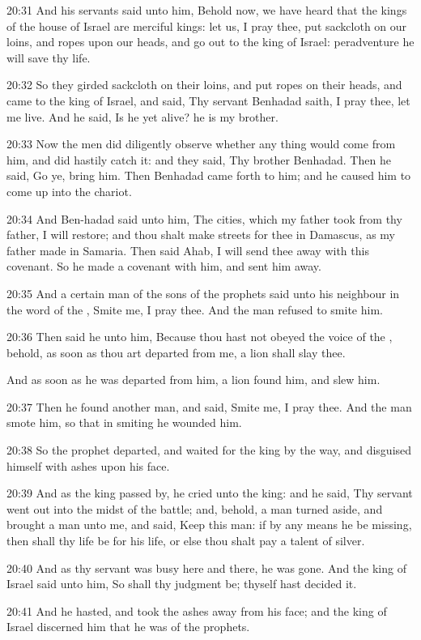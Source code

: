 20:31 And his servants said unto him, Behold now, we have heard that
the kings of the house of Israel are merciful kings: let us, I pray
thee, put sackcloth on our loins, and ropes upon our heads, and go out
to the king of Israel: peradventure he will save thy life.

20:32 So they girded sackcloth on their loins, and put ropes on their
heads, and came to the king of Israel, and said, Thy servant Benhadad
saith, I pray thee, let me live. And he said, Is he yet alive? he is
my brother.

20:33 Now the men did diligently observe whether any thing would come
from him, and did hastily catch it: and they said, Thy brother
Benhadad. Then he said, Go ye, bring him. Then Benhadad came forth to
him; and he caused him to come up into the chariot.

20:34 And Ben-hadad said unto him, The cities, which my father took
from thy father, I will restore; and thou shalt make streets for thee
in Damascus, as my father made in Samaria. Then said Ahab, I will send
thee away with this covenant. So he made a covenant with him, and sent
him away.

20:35 And a certain man of the sons of the prophets said unto his
neighbour in the word of the \LORD, Smite me, I pray thee. And the man
refused to smite him.

20:36 Then said he unto him, Because thou hast not obeyed the voice of
the \LORD, behold, as soon as thou art departed from me, a lion shall
slay thee.

And as soon as he was departed from him, a lion found him, and slew
him.

20:37 Then he found another man, and said, Smite me, I pray thee. And
the man smote him, so that in smiting he wounded him.

20:38 So the prophet departed, and waited for the king by the way, and
disguised himself with ashes upon his face.

20:39 And as the king passed by, he cried unto the king: and he said,
Thy servant went out into the midst of the battle; and, behold, a man
turned aside, and brought a man unto me, and said, Keep this man: if
by any means he be missing, then shall thy life be for his life, or
else thou shalt pay a talent of silver.

20:40 And as thy servant was busy here and there, he was gone. And the
king of Israel said unto him, So shall thy judgment be; thyself hast
decided it.

20:41 And he hasted, and took the ashes away from his face; and the
king of Israel discerned him that he was of the prophets.

